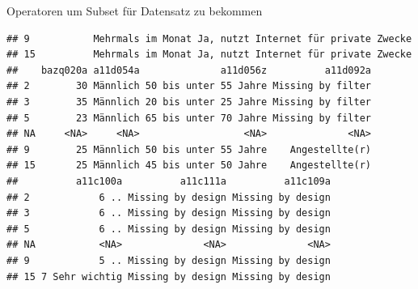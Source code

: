 \documentclass[ignorenonframetext,]{beamer}
\begin{document}
\begin{frame}[fragile]{Operatoren um Subset für Datensatz zu bekommen}
\begin{verbatim}
## 9           Mehrmals im Monat Ja, nutzt Internet für private Zwecke
## 15          Mehrmals im Monat Ja, nutzt Internet für private Zwecke
##    bazq020a a11d054a              a11d056z          a11d092a
## 2        30 Männlich 50 bis unter 55 Jahre Missing by filter
## 3        35 Männlich 20 bis unter 25 Jahre Missing by filter
## 5        23 Männlich 65 bis unter 70 Jahre Missing by filter
## NA     <NA>     <NA>                  <NA>              <NA>
## 9        25 Männlich 50 bis unter 55 Jahre    Angestellte(r)
## 15       25 Männlich 45 bis unter 50 Jahre    Angestellte(r)
##          a11c100a          a11c111a          a11c109a
## 2            6 .. Missing by design Missing by design
## 3            6 .. Missing by design Missing by design
## 5            6 .. Missing by design Missing by design
## NA           <NA>              <NA>              <NA>
## 9            5 .. Missing by design Missing by design
## 15 7 Sehr wichtig Missing by design Missing by design
\end{verbatim}

\end{frame}
\end{document}
